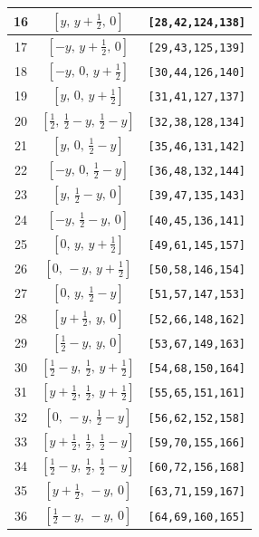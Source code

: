 \documentclass[fleqn,8pt]{jsarticle}
\begin{document}
\begin{longtable}{ccc}
16 & $\left[ y,\, y + \frac{1}{2},\, 0 \right]$ & {\tt [28,42,124,138]} \\ \hline
17 & $\left[ - y,\, y + \frac{1}{2},\, 0 \right]$ & {\tt [29,43,125,139]} \\ \hline
18 & $\left[ - y,\, 0,\, y + \frac{1}{2} \right]$ & {\tt [30,44,126,140]} \\ \hline
19 & $\left[ y,\, 0,\, y + \frac{1}{2} \right]$ & {\tt [31,41,127,137]} \\ \hline
20 & $\left[ \frac{1}{2},\, \frac{1}{2} - y,\, \frac{1}{2} - y \right]$ & {\tt [32,38,128,134]} \\ \hline
21 & $\left[ y,\, 0,\, \frac{1}{2} - y \right]$ & {\tt [35,46,131,142]} \\ \hline
22 & $\left[ - y,\, 0,\, \frac{1}{2} - y \right]$ & {\tt [36,48,132,144]} \\ \hline
23 & $\left[ y,\, \frac{1}{2} - y,\, 0 \right]$ & {\tt [39,47,135,143]} \\ \hline
24 & $\left[ - y,\, \frac{1}{2} - y,\, 0 \right]$ & {\tt [40,45,136,141]} \\ \hline
25 & $\left[ 0,\, y,\, y + \frac{1}{2} \right]$ & {\tt [49,61,145,157]} \\ \hline
26 & $\left[ 0,\, - y,\, y + \frac{1}{2} \right]$ & {\tt [50,58,146,154]} \\ \hline
27 & $\left[ 0,\, y,\, \frac{1}{2} - y \right]$ & {\tt [51,57,147,153]} \\ \hline
28 & $\left[ y + \frac{1}{2},\, y,\, 0 \right]$ & {\tt [52,66,148,162]} \\ \hline
29 & $\left[ \frac{1}{2} - y,\, y,\, 0 \right]$ & {\tt [53,67,149,163]} \\ \hline
30 & $\left[ \frac{1}{2} - y,\, \frac{1}{2},\, y + \frac{1}{2} \right]$ & {\tt [54,68,150,164]} \\ \hline
31 & $\left[ y + \frac{1}{2},\, \frac{1}{2},\, y + \frac{1}{2} \right]$ & {\tt [55,65,151,161]} \\ \hline
32 & $\left[ 0,\, - y,\, \frac{1}{2} - y \right]$ & {\tt [56,62,152,158]} \\ \hline
33 & $\left[ y + \frac{1}{2},\, \frac{1}{2},\, \frac{1}{2} - y \right]$ & {\tt [59,70,155,166]} \\ \hline
34 & $\left[ \frac{1}{2} - y,\, \frac{1}{2},\, \frac{1}{2} - y \right]$ & {\tt [60,72,156,168]} \\ \hline
35 & $\left[ y + \frac{1}{2},\, - y,\, 0 \right]$ & {\tt [63,71,159,167]} \\ \hline
36 & $\left[ \frac{1}{2} - y,\, - y,\, 0 \right]$ & {\tt [64,69,160,165]} \\ \hline

\end{longtable}
\end{document}

